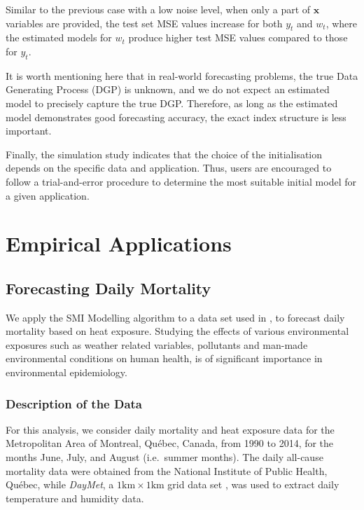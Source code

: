 \documentclass[
  11pt,
  a4paper,
]{article}
\begin{document}
Similar to the previous case with a low noise level, when only a part of
\(\bm{x}\) variables are provided, the test set MSE values increase for
both \(y_{t}\) and \(w_{t}\), where the estimated models for \(w_{t}\)
produce higher test MSE values compared to those for \(y_{t}\).

It is worth mentioning here that in real-world forecasting problems, the
true Data Generating Process (DGP) is unknown, and we do not expect an
estimated model to precisely capture the true DGP. Therefore, as long as
the estimated model demonstrates good forecasting accuracy, the exact
index structure is less important.

Finally, the simulation study indicates that the choice of the
initialisation depends on the specific data and application. Thus, users
are encouraged to follow a trial-and-error procedure to determine the
most suitable initial model for a given application.

\section{Empirical Applications}\label{sec-application}

\subsection{Forecasting Daily Mortality}\label{sec-mortality}

We apply the SMI Modelling algorithm to a data set used in
\textcite{Masselot2022}, to forecast daily mortality based on heat
exposure. Studying the effects of various environmental exposures such
as weather related variables, pollutants and man-made environmental
conditions on human health, is of significant importance in
environmental epidemiology.

\subsubsection{Description of the Data}\label{description-of-the-data}

For this analysis, we consider daily mortality and heat exposure data
for the Metropolitan Area of Montreal, Québec, Canada, from 1990 to
2014, for the months June, July, and August (i.e.~summer months). The
daily all-cause mortality data were obtained from the National Institute
of Public Health, Québec, while \emph{DayMet}, a
\(1\text{km} \times 1\text{km}\) grid data set \autocite{Thornton2021},
was used to extract daily temperature and humidity data.
\end{document}
